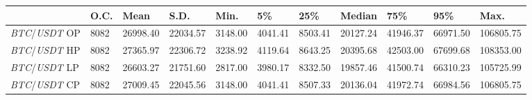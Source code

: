 \begin{tabular}{lllllllllll}
\toprule
 & \textbf{O.C.} & \textbf{Mean} & \textbf{S.D.} & \textbf{Min.} & \textbf{5\%} & \textbf{25\%} & \textbf{Median} & \textbf{75\%} & \textbf{95\%} & \textbf{Max.} \\
\midrule
\emph{BTC}/\emph{USDT} OP & 8082 & 26998.40 & 22034.57 & 3148.00 & 4041.41 & 8503.41 & 20127.24 & 41946.37 & 66971.50 & 106805.75 \\
\emph{BTC}/\emph{USDT} HP & 8082 & 27365.97 & 22306.72 & 3238.92 & 4119.64 & 8643.25 & 20395.68 & 42503.00 & 67699.68 & 108353.00 \\
\emph{BTC}/\emph{USDT} LP & 8082 & 26603.27 & 21751.60 & 2817.00 & 3980.17 & 8332.50 & 19857.46 & 41500.74 & 66310.23 & 105725.99 \\
\emph{BTC}/\emph{USDT} CP & 8082 & 27009.45 & 22045.56 & 3148.00 & 4041.41 & 8507.33 & 20136.04 & 41972.74 & 66984.56 & 106805.75 \\
\bottomrule
\end{tabular}
